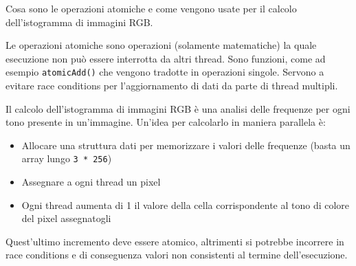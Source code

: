 \begin{questions}
    \question Cosa sono le operazioni atomiche e come vengono usate per il calcolo dell'istogramma di immagini RGB.
    
    \begin{solution}
    	Le operazioni atomiche sono operazioni (solamente matematiche) la quale esecuzione non può essere interrotta da altri thread. Sono funzioni, come ad esempio \texttt{atomicAdd()} che vengono tradotte in operazioni singole. Servono a evitare race conditions per l'aggiornamento di dati da parte di thread multipli.
    	
    	Il calcolo dell'istogramma di immagini RGB è una analisi delle frequenze per ogni tono presente in un'immagine. Un'idea per calcolarlo in maniera parallela è:
    	\begin{itemize}
    		\item Allocare una struttura dati per memorizzare i valori delle frequenze (basta un array lungo \texttt{3 * 256})
    		
    		\item Assegnare a ogni thread un pixel
    		
    		\item Ogni thread aumenta di 1 il valore della cella corrispondente al tono di colore del pixel assegnatogli
    	\end{itemize}
    	
    	Quest'ultimo incremento deve essere atomico, altrimenti si potrebbe incorrere in race conditions e di conseguenza valori non consistenti al termine dell'esecuzione.
    \end{solution}
\end{questions}